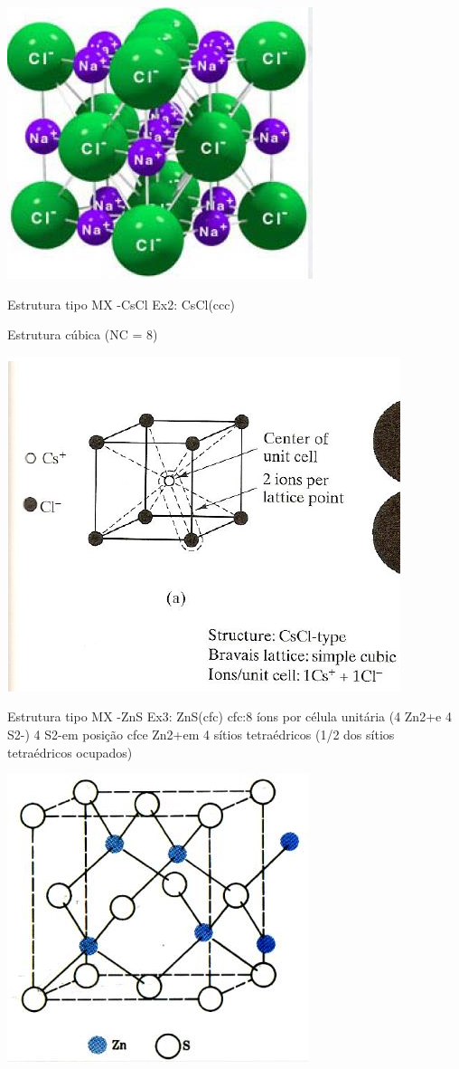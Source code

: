  \includegraphics[scale=0.5,trim={0 0 0 0}]{figures/NaCl}


Estrutura tipo MX -CsCl
Ex2: CsCl(ccc)

Estrutura cúbica (NC = 8)

 \includegraphics[scale=0.2,trim={0 0 0 0}]{figures/CsCl}
 
 

Estrutura tipo MX -ZnS
Ex3: ZnS(cfc)
cfc:8 íons por célula unitária (4 Zn2+e 4 S2-)
4 S2-em posição cfce Zn2+em 4 sítios tetraédricos
(1/2 dos sítios tetraédricos ocupados)

 \includegraphics[scale=0.3,trim={0 0 0 0}]{figures/ZnS}



